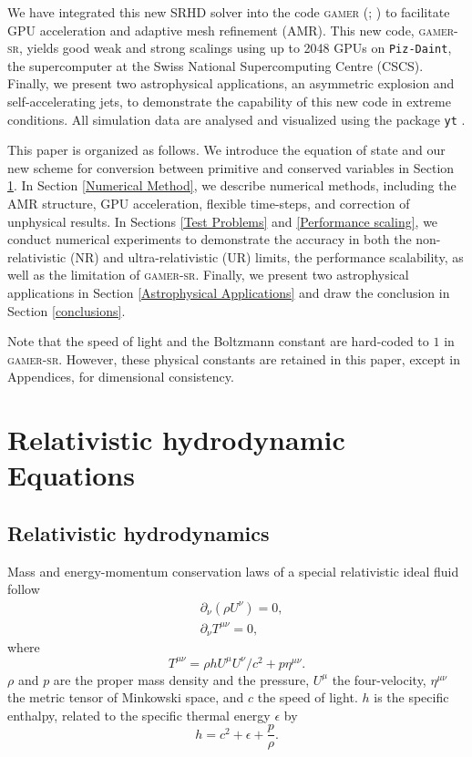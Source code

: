 \documentclass[twocolumn]{aastex63}
\begin{document}
We have integrated this new SRHD solver into the code \textsc{gamer}
(\citealt{gamer-1}; \citealt{gamer-2}) to facilitate GPU acceleration and adaptive mesh
refinement (AMR). This new code, \textsc{gamer-sr}, yields good weak and strong
scalings using up to 2048 GPUs on \texttt{Piz-Daint}, the supercomputer at the Swiss
National Supercomputing Centre (CSCS). Finally, we present two astrophysical applications,
an asymmetric explosion and self-accelerating jets, to demonstrate the capability of
this new code in extreme conditions. All simulation data are analysed and visualized
using the package \texttt{yt} \citep{YT}.

This paper is organized as follows. We introduce the equation of state and our new scheme
for conversion between primitive and conserved variables in Section
\ref{Relativistic Hydrodynamic Equations}. In Section \ref{Numerical Method}, we describe
numerical methods, including the AMR structure, GPU acceleration, flexible time-steps,
and correction of unphysical results. In Sections \ref{Test Problems} and
\ref{Performance scaling}, we conduct numerical experiments to demonstrate the accuracy in
both the non-relativistic (NR) and ultra-relativistic (UR) limits, the performance scalability,
as well as the limitation of \textsc{gamer-sr}. Finally, we present two astrophysical
applications in Section \ref{Astrophysical Applications} and draw the
conclusion in Section \ref{conclusions}.

Note that the speed of light and the Boltzmann constant are hard-coded to
$1$ in \textsc{gamer-sr}. However, these physical constants are retained in this paper,
except in Appendices, for dimensional consistency.

\section{Relativistic hydrodynamic Equations}
\label{Relativistic Hydrodynamic Equations}
\subsection{Relativistic hydrodynamics}
\label{Relativistic Hydrodynamics}
Mass and energy-momentum conservation laws of a special relativistic ideal fluid follow
\begin{subequations}
\label{eq:conservation laws}
\begin{align}
&\partial_{\nu}\left(\rho U^{\nu}\right)=0, \label{eq:number conservation}\\
&\partial_{\nu}T^{\mu \nu} = 0, \label{eq:energy conservation}
\end{align}
\end{subequations}
where
\begin{equation}
T^{\mu \nu} = \rho h U^{\mu} U^{\nu}/c^2 + p \eta^{\mu \nu}.
\end{equation}
$\rho$ and $p$ are the proper mass density and the pressure, $U^\mu$ the four-velocity, $\eta^{\mu \nu}$ the metric tensor of Minkowski space, and $c$ the speed of light. $h$ is the specific enthalpy, related to the specific thermal energy $\epsilon$ by
\begin{equation}
  h=c^2+\epsilon +\frac{p}{\rho}.
  \label{eq:eos}
\end{equation}
\end{document}
